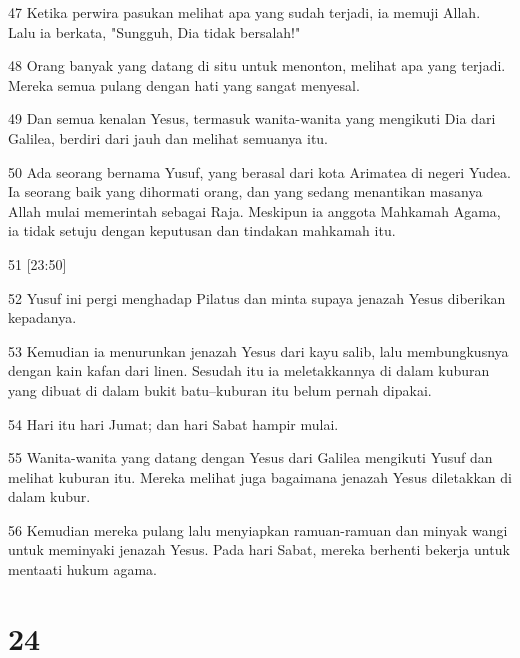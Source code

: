 \par 47 Ketika perwira pasukan melihat apa yang sudah terjadi, ia memuji Allah. Lalu ia berkata, "Sungguh, Dia tidak bersalah!"
\par 48 Orang banyak yang datang di situ untuk menonton, melihat apa yang terjadi. Mereka semua pulang dengan hati yang sangat menyesal.
\par 49 Dan semua kenalan Yesus, termasuk wanita-wanita yang mengikuti Dia dari Galilea, berdiri dari jauh dan melihat semuanya itu.
\par 50 Ada seorang bernama Yusuf, yang berasal dari kota Arimatea di negeri Yudea. Ia seorang baik yang dihormati orang, dan yang sedang menantikan masanya Allah mulai memerintah sebagai Raja. Meskipun ia anggota Mahkamah Agama, ia tidak setuju dengan keputusan dan tindakan mahkamah itu.
\par 51 [23:50]
\par 52 Yusuf ini pergi menghadap Pilatus dan minta supaya jenazah Yesus diberikan kepadanya.
\par 53 Kemudian ia menurunkan jenazah Yesus dari kayu salib, lalu membungkusnya dengan kain kafan dari linen. Sesudah itu ia meletakkannya di dalam kuburan yang dibuat di dalam bukit batu--kuburan itu belum pernah dipakai.
\par 54 Hari itu hari Jumat; dan hari Sabat hampir mulai.
\par 55 Wanita-wanita yang datang dengan Yesus dari Galilea mengikuti Yusuf dan melihat kuburan itu. Mereka melihat juga bagaimana jenazah Yesus diletakkan di dalam kubur.
\par 56 Kemudian mereka pulang lalu menyiapkan ramuan-ramuan dan minyak wangi untuk meminyaki jenazah Yesus. Pada hari Sabat, mereka berhenti bekerja untuk mentaati hukum agama.

\chapter{24}

